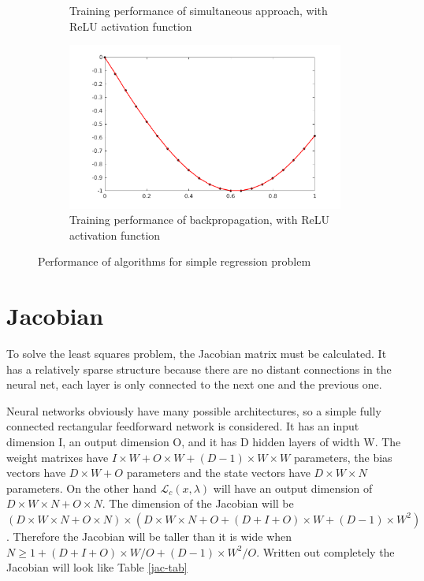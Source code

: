 \begin{figure}
\begin{subfigure}[b]{0.8\textwidth}
         \caption{Training performance of simultaneous approach, with ReLU activation function}
         \label{alm-relu}
     \end{subfigure}
     \begin{subfigure}[b]{0.8\textwidth}
         \centering
         \includegraphics[width=\textwidth]{back-relu}
         \caption{Training performance of backpropagation, with ReLU activation function}
         \label{}
     \end{subfigure}
        \caption{Performance of algorithms for simple regression problem}
        \label{back-relu}
\end{figure}

\section{Jacobian}
To solve the least squares problem, the Jacobian matrix must be calculated. It has a relatively sparse structure because there are no distant connections in the neural net, each layer is only connected to the next one and the previous one.

Neural networks obviously have many possible architectures, so a simple fully connected rectangular feedforward network is considered. It has an input dimension I, an output dimension O, and it has D hidden layers of width W. The weight matrixes have $I\times W + O\times W + (D-1)\times W\times W$ parameters, the bias vectors have $D\times W+O$ parameters and the state vectors have $D\times W\times N$ parameters. On the other hand $\mathcal{L}_c(x,\lambda)$ will have an output dimension of $D\times W \times N + O\times N$. The dimension of the Jacobian will be $(D \times W\times N + O\times N)\times (D\times W\times N + O + (D+I+O)\times W + (D-1)\times W^2)$. Therefore the Jacobian will be taller than it is wide when $N \geq 1 + (D+I+O)\times W/O + (D-1)\times W^2/O$. Written out completely the Jacobian will look like Table \ref{jac-tab}

